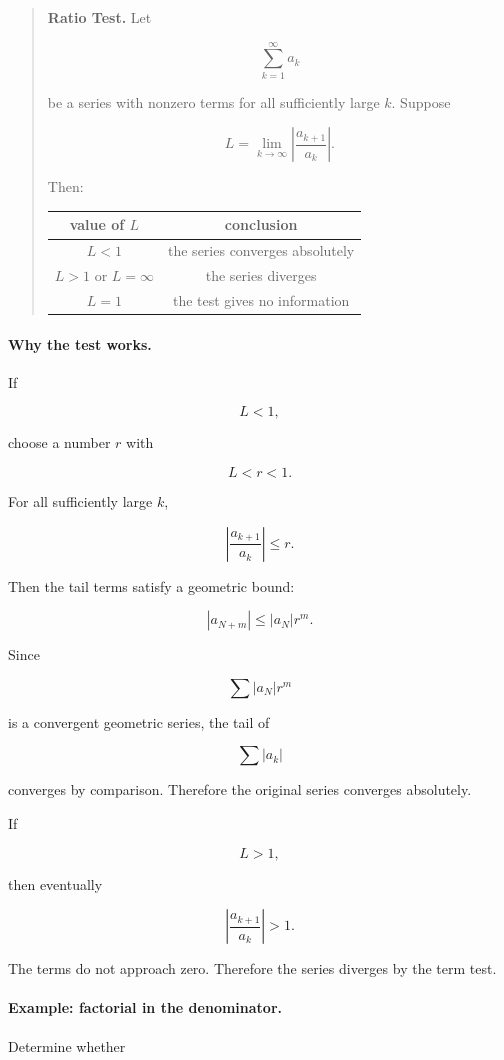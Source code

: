 \begin{quote}
\textbf{Ratio Test.}
Let

\[
\sum_{k=1}^{\infty}a_k
\]

be a series with nonzero terms for all sufficiently large \(k\).  Suppose

\[
L=\lim_{k\to\infty}\left|\frac{a_{k+1}}{a_k}\right|.
\]

Then:

\begin{center}
\begin{tabular}{c|c}
\textbf{value of \(L\)} & \textbf{conclusion} \\ \hline
\(L<1\) & the series converges absolutely \\[3pt]
\(L>1\) or \(L=\infty\) & the series diverges \\[3pt]
\(L=1\) & the test gives no information
\end{tabular}
\end{center}
\end{quote}

\paragraph{Why the test works.}
If

\[
L<1,
\]

choose a number \(r\) with

\[
L<r<1.
\]

For all sufficiently large \(k\),

\[
\left|\frac{a_{k+1}}{a_k}\right|\le r.
\]

Then the tail terms satisfy a geometric bound:

\[
|a_{N+m}|\le |a_N|r^m.
\]

Since

\[
\sum |a_N|r^m
\]

is a convergent geometric series, the tail of

\[
\sum |a_k|
\]

converges by comparison.  Therefore the original series converges absolutely.

If

\[
L>1,
\]

then eventually

\[
\left|\frac{a_{k+1}}{a_k}\right|>1.
\]

The terms do not approach zero.  Therefore the series diverges by the term test.

\paragraph{Example: factorial in the denominator.}
Determine whether

